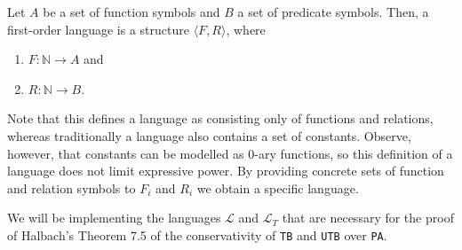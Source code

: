 
\begin{definition}\label{def:fol}
    \leanok
    Let $A$ be a set of function symbols and $B$ a set of predicate symbols. Then, a first-order language is a structure $\langle F, R \rangle$, where 
        \begin{enumerate}
            \item $F : \mathbb{N} \to A$ and
            \item $R : \mathbb{N} \to B$.
        \end{enumerate}

\end{definition}

Note that this defines a language as consisting only of functions and relations, whereas traditionally a language also contains a set of constants. Observe, however, that constants can be modelled as $0$-ary functions, so this definition of a language does not limit expressive power. By providing concrete sets of function and relation symbols to $F_i$ and $R_i$ we obtain a specific language. 

We will be implementing the languages $\mathcal{L}$ and $\mathcal{L}_T$ that are necessary for the proof of Halbach's \cite{halbach2011} Theorem 7.5 of the conservativity of \texttt{TB} and \texttt{UTB} over \texttt{PA}.

